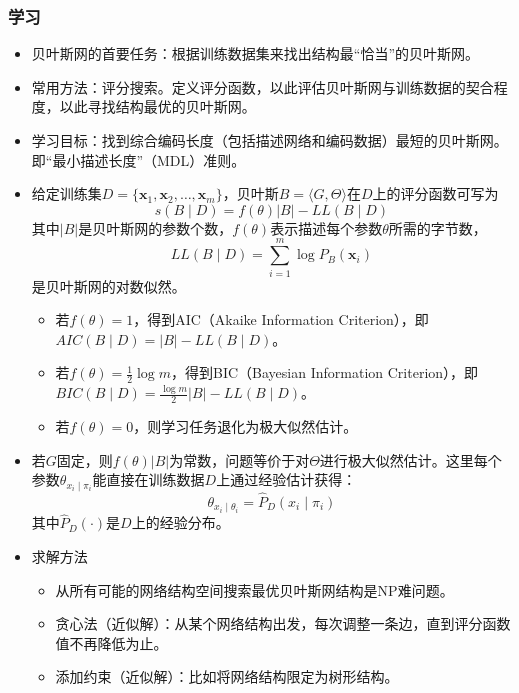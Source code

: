 \documentclass{ctexart}
\begin{document}
					\subsubsection{学习}
						\begin{itemize}
							\item 贝叶斯网的首要任务：根据训练数据集来找出结构最``恰当''的贝叶斯网。
							\item 常用方法：评分搜索。定义评分函数，以此评估贝叶斯网与训练数据的契合程度，以此寻找结构最优的贝叶斯网。
							\item 学习目标：找到综合编码长度（包括描述网络和编码数据）最短的贝叶斯网。即``最小描述长度''（MDL）准则。
							\item 给定训练集$D=\{\bm{x}_1,\bm{x}_2,\dots,\bm{x}_m\}$，贝叶斯$B=\langle G,\Theta\rangle$在$D$上的评分函数可写为\[s(B\mid D)=f(\theta)|B|-LL(B\mid D)\]其中$|B|$是贝叶斯网的参数个数，$f(\theta)$表示描述每个参数$\theta$所需的字节数，\[LL(B\mid D)=\sum_{i=1}^{m}\log P_B(\bm{x}_i)\]是贝叶斯网的对数似然。\begin{itemize}
								\item 若$f(\theta)=1$，得到AIC（Akaike Information Criterion），即$AIC(B\mid D)=|B|-LL(B\mid D)$。
								\item 若$f(\theta)=\frac{1}{2}\log m$，得到BIC（Bayesian Information Criterion），即$BIC(B\mid D)=\frac{\log m}{2}|B|-LL(B\mid D)$。
								\item 若$f(\theta)=0$，则学习任务退化为极大似然估计。
							\end{itemize}
							\item 若$G$固定，则$f(\theta)|B|$为常数，问题等价于对$\Theta$进行极大似然估计。这里每个参数$\theta_{x_i\mid\pi_i}$能直接在训练数据$D$上通过经验估计获得：\[\theta_{x_i\mid\theta_i}=\hat{P}_D(x_i\mid\pi_i)\]其中$\hat{P}_D(\cdot)$是$D$上的经验分布。
							\item 求解方法\begin{itemize}
								\item 从所有可能的网络结构空间搜索最优贝叶斯网结构是NP难问题。
								\item 贪心法（近似解）：从某个网络结构出发，每次调整一条边，直到评分函数值不再降低为止。
								\item 添加约束（近似解）：比如将网络结构限定为树形结构。
							\end{itemize}
						\end{itemize}
\end{document}
